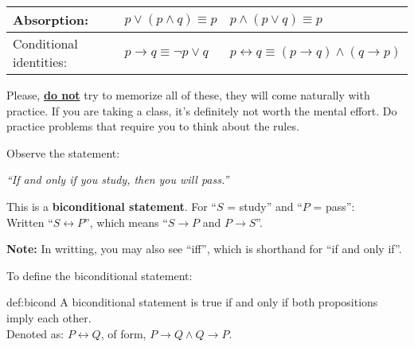 \begin{tabular}{|p{2cm}|l|l|}
    \\
    \hline
    \cellcolor{OliveGreen!10}Absorption:                                             & $p\lor (p\land q) \equiv p $                        & $p\land (p\lor q) \equiv p$                          \\
    \hline
    \cellcolor{OliveGreen!10}Conditional identities:                                 & $p\rightarrow q \equiv \neg p \lor q$               &
    $p\leftrightarrow q \equiv (p\rightarrow q)\land (q\rightarrow p)$                                                                                                                            \\
    \hline
\end{tabular}

\begin{Tip}
    Please, \underline{\textbf{do not}} try to memorize all of these, they will come naturally with practice. If
    you are taking a class, it's definitely not worth the mental effort. Do practice problems that
    require you to think about the rules.\\
\end{Tip}

\noindent
Observe the statement:

\begin{center}
    \Large
    \textit{``If and only if you study, then you will pass.''}
\end{center}

\noindent
This is a \textbf{biconditional statement}. For ``$S$ = study'' and ``$P$ = pass'':\\
Written ``$S \leftrightarrow P$'', which means ``$S\rightarrow P$ and $P\rightarrow S$''.\\

\begin{Note}
    \textbf{Note:} In writting, you may also see ``iff'', which is shorthand for ``if and only if''.\\
\end{Note}

\newpage

\noindent
To define the biconditional statement:
\begin{Def}[Biconditional]{def:bicond}
    A biconditional statement is true if and only if both propositions imply each other.\\
    Denoted as: $P \leftrightarrow Q$, of form, $P\rightarrow Q\land Q\rightarrow P$.\\
\end{Def}

